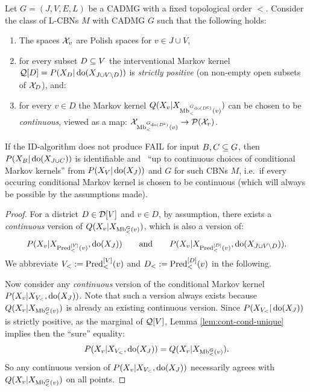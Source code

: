 \begin{Thm}
    \label{thm:ID-soundness-cont}
    Let $G=(J,V,E,L)$ be a CADMG with a fixed topological order $<$. %
    Consider the class of L-CBNs $M$ with \observational CADMG $G$ such that the following holds: 
    \begin{enumerate}
        \item The spaces $\mathcal{X}_v$ are Polish spaces for $v \in J \cup V$,
        \item for every subset $D \subseteq V$ the interventional Markov kernel $\mathcal{Q}[D]=P(X_D|\operatorname{do}(X_{J \cup V \setminus D}))$ 
            is \emph{strictly positive} (on non-empty open subsets of $\mathcal{X}_{D}$), and:
        \item for every $v \in D$ the Markov kernel $Q(X_v|X_{\mathrm{Mb}^{G_{\operatorname{do}(D^{\mathsf{c}})}}_<(v)})$ 
            can be chosen to be \emph{continuous}, viewed as a map: $\mathcal{X}_{\mathrm{Mb}^{G_{\operatorname{do}(D^{\mathsf{c}})}}_<(v)} \to \mathcal{P}(\mathcal{X}_v)$.
    \end{enumerate}
    If the ID-algorithm does not produce FAIL for input $B, C \subseteq G$,
    then $P(X_B|\operatorname{do}(X_{J \cup C}))$ is identifiable
    and \trackable\ ``up to continuous choices of conditional Markov kernels'' 
    from $P(X_V|\operatorname{do}(X_J))$ and $G$ for such CBNs $M$, 
    i.e.\ if every occuring conditional Markov kernel is chosen to be continuous (which will always be possible by the assumptions made).
    \begin{proof}
        For a district $D \in \mathcal{D}[V]$ and $v \in D$, 
        by assumption, there exists a \emph{continuous} version of $Q(X_v|X_{\mathrm{Mb}^G_<(v)})$, which is also a version of:
     \[ P(X_v|X_{\mathrm{Pred}^{[V]}_<(v)},\operatorname{do}(X_J)) \qquad \text{and} \qquad P(X_v|X_{\mathrm{Pred}^{[D]}_<(v)},\operatorname{do}(X_{J \cup V\setminus D})).\]
      We abbreviate $V_<:=\mathrm{Pred}^{[V]}_<(v)$ and $D_<:=\mathrm{Pred}^{[D]}_<(v)$ in the following.

     Now consider any \emph{continuous} version of the conditional Markov kernel $P(X_v|X_{V_<},\operatorname{do}(X_J))$.
     Note that such a version always exists because $Q(X_v|X_{\mathrm{Mb}^G_<(v)})$ is already an existing continuous version.
     Since $P(X_{V_<}|\operatorname{do}(X_J))$ is strictly positive, as the marginal of $\mathcal{Q}[V]$,
      Lemma \ref{lem:cont-cond-unique} implies then the ``sure'' equality:
	    \[ P(X_v|X_{V_<},\operatorname{do}(X_J))=Q(X_v|X_{\mathrm{Mb}^G_<(v)}).  \]
     So any continuous version of $P(X_v|X_{V_<},\operatorname{do}(X_J))$ necessarily agrees with $Q(X_v|X_{\mathrm{Mb}^G_<(v)})$ on all points.


\end{proof}
\end{Thm}

